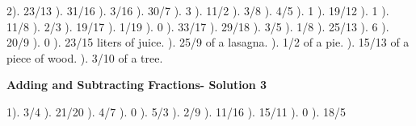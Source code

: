 \documentclass{article}%
\begin{document}
2). 23/13%
). 31/16%
). 3/16%
). 30/7%
). 3%
). 11/2%
). 3/8%
). 4/5%
). 1%
). 19/12%
). 1%
). 11/8%
). 2/3%
). 19/17%
). 1/19%
). 0%
). 33/17%
). 29/18%
). 3/5%
). 1/8%
). 25/13%
). 6%
). 20/9%
). 0%
). 23/15 liters of juice.%
). 25/9 of a lasagna.%
). 1/2 of a pie.%
). 15/13 of a piece of wood.%
). 3/10 of a tree.%
\newline%
\newpage%
\large%
\begin{center}%
\textbf{Adding and Subtracting Fractions- Solution 3}%
\newline%
\end{center} \normalsize%
1). 3/4%
). 21/20%
). 4/7%
). 0%
). 5/3%
). 2/9%
). 11/16%
). 15/11%
). 0%
). 18/5%
\end{document}
